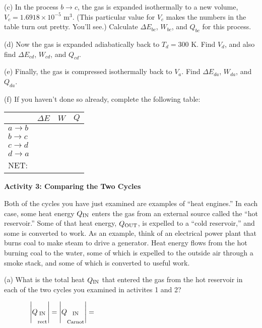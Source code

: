 \pagebreak
(c) In the process $b \rightarrow c$, the gas is expanded isothermally to a new volume, $V_c=1.6918 \times 10^{-5}$ m$^3$.  (This particular value for $V_c$ makes the numbers in the table turn out pretty.  You'll see.)  Calculate $\Delta E_{bc}$, $W_{bc}$, and $Q_{bc}$ for this process.  
\answerspace{1.6in}

(d) Now the gas is expanded adiabatically back to $T_d=300$ K.  Find $V_d$, and also find  $\Delta E_{cd}$, $W_{cd}$, and $Q_{cd}$.
\answerspace{2.0in}


(e) Finally, the gas is compressed isothermally back to $V_a$.  Find $\Delta E_{da}$, $W_{da}$, and $Q_{da}$.  
\answerspace{1.6in}



(f) If you haven't done so already, complete the following table:
\vspace{0.1 in}

{\renewcommand{\arraystretch}{2.0}
\begin{tabular}{| C{1in} |C{1in} | C{1in} | C{1in} |}
\hline
& $\Delta E$ & $W$ & $Q$ \\ \hline
$a \rightarrow b$ & & & \\ \hline
$b \rightarrow c$ & & & \\ \hline
$c \rightarrow d$ & & & \\ \hline
$d \rightarrow a$ & & & \\
\hhline{|=|=|=|=|}
NET: & & & \\ \hline
\end{tabular}
}

\pagebreak
\textbf{Activity 3: Comparing the Two Cycles}

Both of the cycles you have just examined are examples of ``heat engines.''  In each case, some heat energy $Q_{\rm IN}$ enters the gas from an external source called the ``hot reservoir.''   Some of that heat energy, $Q_{\rm OUT}$, is expelled to a ``cold reservoir,'' and some is converted to work.    As an example, think of an electrical power plant that burns coal to make steam to drive a generator.  Heat energy flows from the hot burning coal to the water, some of which is expelled to the outside air through a smoke stack, and some of which is converted to useful work.

(a)  What is the total heat $Q_{\rm IN}$ that entered the gas from the hot reservoir in each of the two cycles you examined in activites 1 and 2?

\medskip
$\displaystyle
\hspace{0.5in} 
\left| Q_{\substack{\textrm{IN} \\ \\ \textrm{rect}}} \right| = \hspace{\fill}
\left| Q_{\substack{\textrm{IN} \\ \\ \textrm{Carnot}}} \right|= \hspace{\fill}
$
\answerspace{0.4in}

